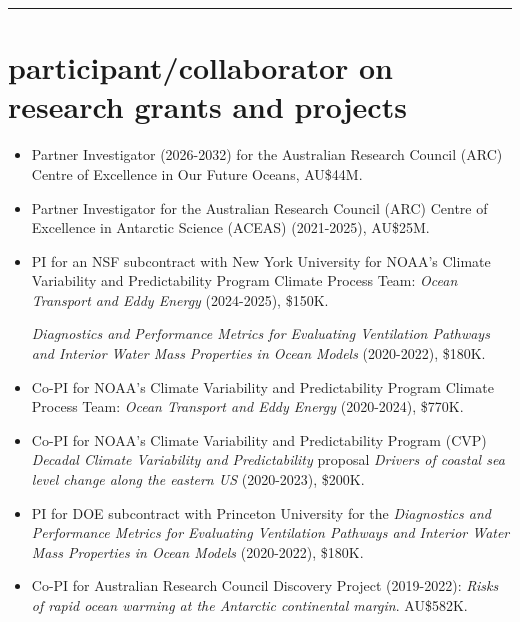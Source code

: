 \documentclass{article}
\begin{document}



\noindent\rule{\textwidth}{1pt}
\vspace{-1cm}
\section*{\sc \color{Maroon}  participant/collaborator on research grants and projects}
\vspace{-.3cm}

\begin{itemize}[leftmargin=*]

\item Partner Investigator (2026-2032) for the Australian Research Council (ARC) Centre of Excellence in Our Future Oceans, AU\$44M. 

\item Partner Investigator for the Australian Research Council (ARC) Centre of Excellence in Antarctic Science (ACEAS) (2021-2025), AU\$25M.
 
\item PI for an NSF subcontract with New York  University for NOAA's Climate Variability and Predictability Program Climate Process Team: {\it Ocean Transport and Eddy Energy} (2024-2025), \$150K.

{\it Diagnostics and Performance Metrics for Evaluating Ventilation Pathways and Interior Water Mass Properties in Ocean Models} (2020-2022), \$180K. 
 
\item Co-PI for NOAA's Climate Variability and Predictability Program Climate Process Team: {\it Ocean Transport and Eddy Energy} (2020-2024), \$770K.

\item Co-PI for NOAA's Climate Variability and Predictability Program (CVP) {\it Decadal Climate Variability and Predictability} proposal {\it Drivers of coastal sea level change along the eastern US} (2020-2023), \$200K.  

\item PI for DOE subcontract with Princeton University for the {\it Diagnostics and Performance Metrics for Evaluating Ventilation Pathways and Interior Water Mass Properties in Ocean Models} (2020-2022), \$180K. 

\item Co-PI for Australian Research Council Discovery Project (2019-2022): {\it Risks of rapid ocean warming at the Antarctic continental margin}. AU\$582K.


\end{itemize}
\end{document}
